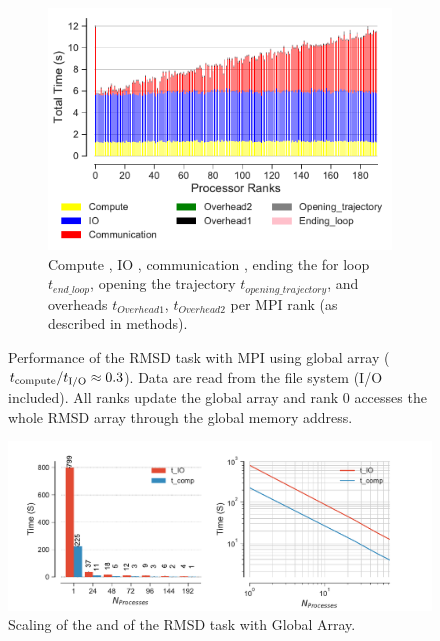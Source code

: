\begin{figure}
\begin{subfigure} {.8\textwidth}
  \includegraphics[width=\linewidth]{figures/split-BarPlot-rank-comparison_192_5.pdf}
  \caption{Compute \tcomp, IO \tIO, communication \tcomm , ending the for loop $t_{end\_loop}$,
  opening the trajectory $t_{opening\_trajectory}$, and overheads $t_{Overhead1}$,  $t_{Overhead2}$ per MPI rank (as described in methods).}
  \label{fig:MPIranks-split}
\end{subfigure}
%
\caption{Performance of the RMSD task with MPI using global array (${t}_{\text{compute}}/{t}_{\text{I/O}} \approx 0.3$).
Data are read from the file system (I/O included). All ranks update the global array and rank 0 accesses the whole RMSD array through the global memory address.}
\label{fig:MPIwithIO-split}
\end{figure}

\begin{figure}
\centering
  \includegraphics[width=\linewidth]{figures/split-time_comp_IO_comparison.pdf}
\caption{Scaling of the \tcomp and \tIO of the RMSD task with Global Array.}
\label{fig:ScalingComputeIO-split}
\end{figure}

